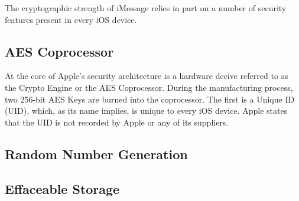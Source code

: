 The cryptographic strength of iMessage relies in part on a number of security
features present in every iOS device.

\subsection{AES Coprocessor}
At the core of Apple's security architecture is a hardware decive referred to
as the Crypto Engine or the AES Coprocessor. During the manufacturing process,
two 256-bit AES Keys are burned into the coprocessor. The first is a Unique ID
(UID), which, as its name implies, is unique to every iOS device. Apple states
that the UID is not recorded by Apple or any of its suppliers\cite{apple}.


\subsection{Random Number Generation}

\subsection{Effaceable Storage}
